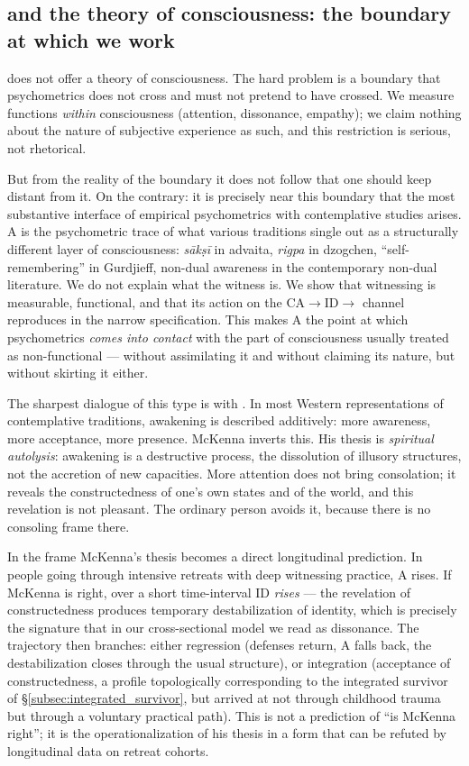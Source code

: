 \subsection{\DEIC{} and the theory of consciousness: the boundary at which we work}
\label{subsec:consciousness}

\DEIC{} does not offer a theory of consciousness. The hard problem \citep{chalmers1995} is a boundary that psychometrics does not cross and must not pretend to have crossed. We measure functions \emph{within} consciousness (attention, dissonance, empathy); we claim nothing about the nature of subjective experience as such, and this restriction is serious, not rhetorical.

But from the reality of the boundary it does not follow that one should keep distant from it. On the contrary: it is precisely near this boundary that the most substantive interface of empirical psychometrics with contemplative studies arises. A is the psychometric trace of what various traditions single out as a structurally different layer of consciousness: \textit{sākṣī} in advaita, \textit{rigpa} in dzogchen, ``self-remembering'' in Gurdjieff, non-dual awareness in the contemporary non-dual literature. We do not explain what the witness is. We show that witnessing is measurable, functional, and that its action on the CA$\to$ID$\to$\EAF{} channel reproduces in the narrow specification. This makes A the point at which psychometrics \emph{comes into contact} with the part of consciousness usually treated as non-functional --- without assimilating it and without claiming its nature, but without skirting it either.

The sharpest dialogue of this type is with \citet{mckenna2002, mckenna2004, mckenna2013}. In most Western representations of contemplative traditions, awakening is described additively: more awareness, more acceptance, more presence. McKenna inverts this. His thesis is \emph{spiritual autolysis}: awakening is a destructive process, the dissolution of illusory structures, not the accretion of new capacities. More attention does not bring consolation; it reveals the constructedness of one's own states and of the world, and this revelation is not pleasant. The ordinary person avoids it, because there is no consoling frame there.

In the \DEIC{} frame McKenna's thesis becomes a direct longitudinal prediction. In people going through intensive retreats with deep witnessing practice, A rises. If McKenna is right, over a short time-interval ID \emph{rises} --- the revelation of constructedness produces temporary destabilization of identity, which is precisely the signature that in our cross-sectional model we read as dissonance. The trajectory then branches: either regression (defenses return, A falls back, the destabilization closes through the usual structure), or integration (acceptance of constructedness, a profile topologically corresponding to the integrated survivor of §\ref{subsec:integrated_survivor}, but arrived at not through childhood trauma but through a voluntary practical path). This is not a prediction of ``is McKenna right''; it is the operationalization of his thesis in a form that can be refuted by longitudinal data on retreat cohorts.

